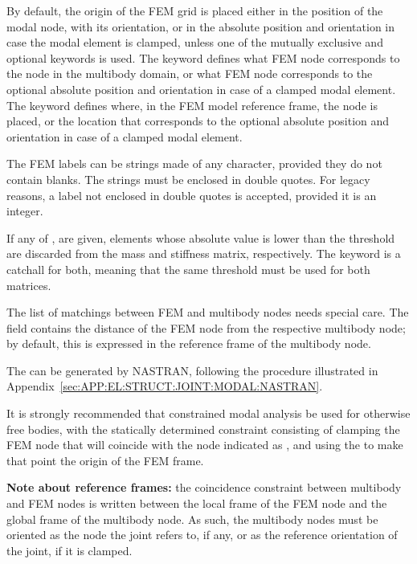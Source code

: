 \noindent
By default, the origin of the FEM grid is placed either in the position
of the modal node, with its orientation, or in the absolute position 
and orientation in case the modal element is clamped, 
unless one of the mutually exclusive  
and  optional keywords is used.
The  keyword defines what FEM node corresponds 
to the  node in the multibody domain,
or what FEM node corresponds to the optional absolute position 
and orientation in case of a clamped modal element.
The  keyword defines where, in the FEM model
reference frame, the  node is placed, or the location
that corresponds to the optional absolute position and orientation
in case of a clamped modal element.

\noindent
The FEM labels can be strings made of any character,
provided they do not contain blanks.
The strings must be enclosed in double quotes.
For legacy reasons, a label not enclosed in double quotes
is accepted, provided it is an integer.

\noindent
If any of ,  are given,
elements whose absolute value is lower than the threshold
are discarded from the mass and stiffness matrix, respectively.
The keyword  is a catchall for both,
meaning that the same threshold must be used for both matrices.

\noindent
The list of matchings between FEM and multibody nodes needs
special care.
The  field contains the distance
of the FEM node from the respective multibody node; by default,
this is expressed in the reference frame of the multibody node.

\noindent
The  can be generated by NASTRAN, 
following the procedure illustrated
in Appendix~\ref{sec:APP:EL:STRUCT:JOINT:MODAL:NASTRAN}.

\noindent
It is strongly recommended that constrained modal analysis
be used for otherwise free bodies, with the statically 
determined constraint consisting of clamping the FEM node 
that will coincide with the node indicated as ,
and using the  to make that point the origin
of the FEM frame.

\noindent
\textbf{Note about reference frames:} the coincidence constraint between 
multibody and FEM nodes is written between the local frame 
of the FEM node and the global frame of the multibody node.
As such, the multibody nodes must be oriented as the 
node the  joint refers to, if any, or as the reference
orientation of the  joint, if it is clamped.

